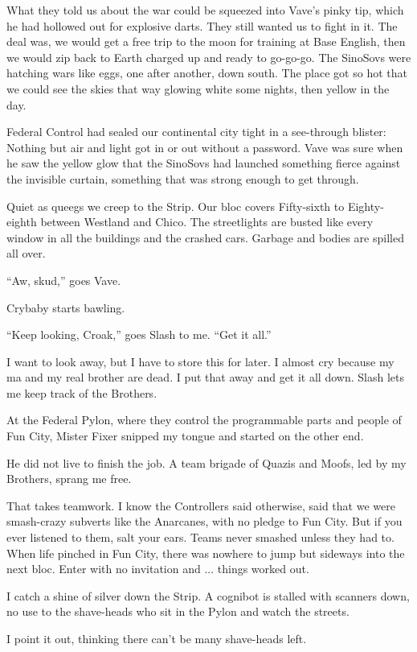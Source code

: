 What they told us about the war could be squeezed into Vave's pinky tip, which he had hollowed out for explosive darts. They still wanted us to fight in it. The deal was, we would get a free trip to the moon for training at Base English, then we would zip back to Earth charged up and ready to go-go-go. The SinoSovs were hatching wars like eggs, one after another, down south. The place got so hot that we could see the skies that way glowing white some nights, then yellow in the day.

Federal Control had sealed our continental city tight in a see-through blister: Nothing but air and light got in or out without a password. Vave was sure when he saw the yellow glow that the SinoSovs had launched something fierce against the invisible curtain, something that was strong enough to get through.

Quiet as queegs we creep to the Strip. Our bloc covers Fifty-sixth to Eighty-eighth between Westland and Chico. The streetlights are busted like every window in all the buildings and the crashed cars. Garbage and bodies are spilled all over.

``Aw, skud,'' goes Vave.

Crybaby starts bawling.

``Keep looking, Croak,'' goes Slash to me. ``Get it all.''

I want to look away, but I have to store this for later. I almost cry because my ma and my real brother are dead. I put that away and get it all down. Slash lets me keep track of the Brothers.

At the Federal Pylon, where they control the programmable parts and people of Fun City, Mister Fixer snipped my tongue and started on the other end.

He did not live to finish the job. A team brigade of Quazis and Moofs, led by my Brothers, sprang me free.

That takes teamwork. I know the Controllers said otherwise, said that we were smash-crazy subverts like the Anarcanes, with no pledge to Fun City. But if you ever listened to them, salt your ears. Teams never smashed unless they had to. When life pinched in Fun City, there was nowhere to jump but sideways into the next bloc. Enter with no invitation and ... things worked out.

I catch a shine of silver down the Strip. A cognibot is stalled with scanners down, no use to the shave-heads who sit in the Pylon and watch the streets.

I point it out, thinking there can't be many shave-heads left.

